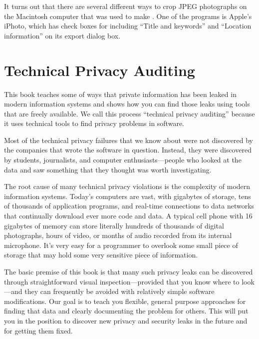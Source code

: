 It turns out that there are several different ways to crop JPEG
photographs on the Macintosh computer that was used to make
. One of the programs is Apple's iPhoto, which has
check boxes for including ``Title and keywords'' and ``Location
information'' on its export dialog box. 




\section{Technical Privacy Auditing}

This book teaches some of  ways that private information has been
leaked in modern information systems and shows how you can find 
those leaks using tools that are freely available. We call this
process ``technical privacy auditing'' because it uses technical
tools to find privacy problems in software.

Most of the technical privacy failures that we know about were not
discovered by the companies that wrote the software in
question. Instead, they were discovered by students,
journalists, and computer enthusiasts---people who looked at the data
and saw something that they thought was worth investigating.

The root cause of many technical privacy violations is the complexity
of modern information systems. Today's computers are vast, with
gigabytes of storage, tens of thousands of application programs, and
real-time connections to data networks that continually download ever 
more code and data. A typical cell phone with 16 gigabytes of memory can
store literally hundreds of thousands of digital photographs, hours of
video, or months of audio recorded from its internal
microphone. It's very easy for a programmer to overlook some small
piece of storage that may hold some very sensitive piece of
information. 

The basic premise of this book is that many such privacy leaks can be
discovered through straightforward visual inspection---provided that
you know where to look---and they can frequently be avoided with
relatively simple software modifications. Our goal is to teach you flexible, general
purpose approaches for finding that data and clearly documenting the
problem for others. This
will put you in the position to discover new privacy and security
leaks in the future and for getting them fixed.

